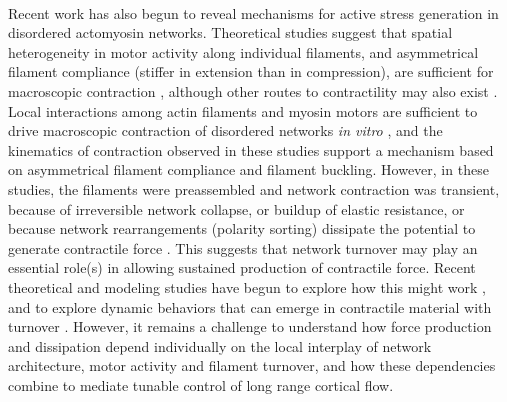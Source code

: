 \documentclass[10pt,letterpaper]{article}
\begin{document}
\paragraph{} Recent work has also begun to reveal mechanisms for active stress generation in disordered actomyosin networks. Theoretical studies suggest that spatial heterogeneity in motor activity along individual filaments, and asymmetrical filament compliance (stiffer in extension than in compression), are sufficient for macroscopic contraction \cite{1367-2630-14-3-033037,PhysRevX.4.041002}, although other routes to contractility may also exist \cite{PhysRevX.4.041002}.  Local interactions among actin filaments and myosin motors are sufficient to drive macroscopic contraction of disordered networks {\em in vitro} \cite{rheo_2D1}, and the kinematics of contraction observed in these studies support a mechanism based on asymmetrical filament compliance and filament buckling.  However, in these studies, the filaments were preassembled and network contraction was transient, because of irreversible network collapse\cite{Alvarado:2013aa}, or buildup of elastic resistance\cite{Murrell15062014}, or because network rearrangements (polarity sorting) dissipate the potential to generate contractile force \cite{Ennomani2016616,Reymann1310,Ndlec:1997aa,Surrey1167}. This suggests that network turnover may play an essential role(s) in allowing sustained production of contractile force. Recent theoretical and modeling studies have begun to explore how this might work \cite{2015arXiv150706182H,Mak:2016aa,10.1371/journal.pone.0000696}, and to explore dynamic behaviors that can emerge in contractile material with turnover \cite{PhysRevLett.103.058102,PhysRevLett.113.148102}. However, it remains a challenge to understand how force production and dissipation depend individually on the local interplay of network architecture, motor activity and filament turnover, and how these dependencies combine to mediate tunable control of long range cortical flow. 
\end{document}
